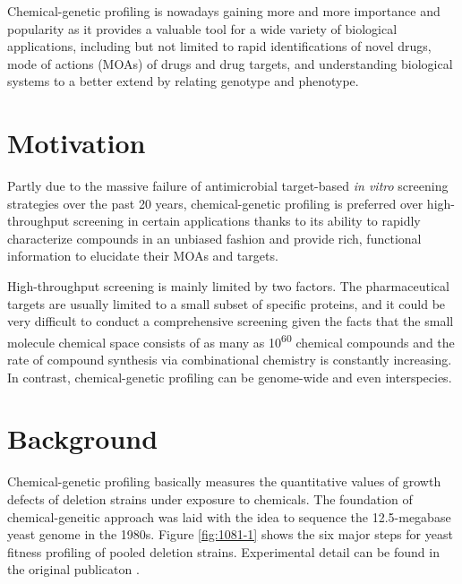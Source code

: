 \documentclass[12pt,fullpage,singlespace]{article}
\begin{document}
Chemical-genetic profiling is nowadays gaining more and more importance and popularity as it provides a valuable tool for a wide variety of biological applications, including but not limited to rapid identifications of novel drugs, mode of actions (MOAs) of drugs and drug targets, and understanding biological systems to a better extend by relating genotype and phenotype.

\section{Motivation}

Partly due to the massive failure of antimicrobial target-based \textit{in vitro} screening strategies over the past 20 years, chemical-genetic profiling is preferred over high-throughput screening in certain applications thanks to its ability to rapidly characterize compounds in an unbiased fashion and provide rich, functional information to elucidate their MOAs and targets.

High-throughput screening is mainly limited by two factors. The pharmaceutical targets are usually limited to a small subset of specific proteins, and it could be very difficult to conduct a comprehensive screening given the facts that the small molecule chemical space consists of as many as 10\textsuperscript{60} chemical compounds \citep{1104} and the rate of compound synthesis via combinational chemistry is constantly increasing. In contrast, chemical-genetic profiling can be genome-wide and even interspecies.

\section{Background}

Chemical-genetic profiling basically measures the quantitative values of growth defects of deletion strains under exposure to chemicals. The foundation of chemical-geneitic approach was laid with the idea to sequence the 12.5-megabase yeast genome in the 1980s. Figure \ref{fig:1081-1} shows the six major steps for yeast fitness profiling of pooled deletion strains. Experimental detail can be found in the original publicaton \citep{1081}.
\end{document}
